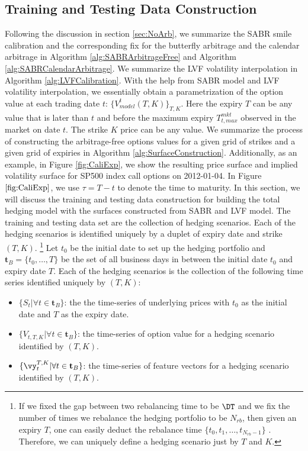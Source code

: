\iffalse



\subsection{Training and Testing Data Construction}
\label{sec:Augtrain}
Following the discussion in section \ref{sec:NoArb}, we summarize the SABR smile calibration and the corresponding fix for the butterfly arbitrage and the calendar arbitrage in Algorithm \ref{alg:SABRArbitrageFree} and Algorithm \ref{alg:SABRCalendarArbitrage}. We summarize the LVF volatility interpolation in Algorithm \ref{alg:LVFCalibration}. With the help from SABR model and LVF volatility interpolation, we essentially obtain a parametrization of the option value at each trading date $t$: $\{V^{t}_{model}(T,K)\}_{T,K}$. Here the expiry $T$  can be any value that is later than $t$ and before  the maximum expiry $T_{t,max}^{mkt}$ observed in the market on date $t$. The strike $K$ price can be any  value. We summarize the process of constructing the arbitrage-free options values for a given grid of strikes and a given grid of expiries in Algorithm \ref{alg:SurfaceConstruction}. Additionally, as an example, in Figure \ref{fig:CaliExp}, we show the resulting price surface and implied  volatility surface for SP500 index call options  on 2012-01-04. In Figure $\ref{fig:CaliExp}$, we use $\tau=T-t$ to denote the time to maturity.  
In this section, we will discuss the training and testing data construction for building the total hedging model with the surfaces constructed from SABR and LVF model. The training and testing data set are the collection of hedging scenarios. Each of the hedging scenarios is identified uniquely by a duplet of expiry date and strike  $(T,K)$. \footnote{ If we fixed the gap between two rebalancing time to be $\DT$ and we fix the number of times we rebalance the hedging portfolio to be $N_{rb}$, then given an expiry $T$, one can easily deduct the rebalance time $\{t_0,t_1, \dots, t_{N_{rb}-1}\}$ . Therefore, we can uniquely define a hedging scenario just by $T$ and $K$.} Let $t_0$ be the initial date to set up the hedging portfolio and $\mathbf{t}_B=\{t_0,\dots,T\}$ be the set of all business days in between the initial date $t_0$ and expiry date $T$.  Each of the hedging scenarios is the collection of the following time series identified uniquely by $(T,K)$:
\begin{itemize}
	\item $\{S_t|\forall t \in \mathbf{t}_B \}$: the the time-series of underlying prices  with $t_0$ as the initial date and $T$ as the expiry date.
	\item $\{V_{t,T,K}|\forall t \in \mathbf{t}_B\}$:  the time-series of option value for a hedging scenario identified by $(T,K)$.
	\item $\{\vy^{T,K}_{t}|\forall t \in \mathbf{t}_B\}$: the time-series of feature vectors for a hedging scenario identified by $(T,K)$.
\end{itemize}
